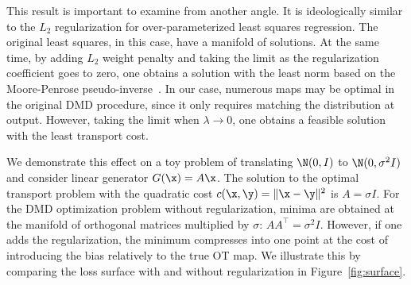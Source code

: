 This result is important to examine from another angle. It is ideologically similar to the $L_2$ regularization for over-parameterized least squares regression. The original least squares, in this case, have a manifold of solutions. At the same time, by adding $L_2$ weight penalty and taking the limit as the regularization coefficient goes to zero, one obtains a solution with the least norm based on the Moore-Penrose pseudo-inverse~\cite{moore1920reciprocal, penrose1955generalized}. In our case, numerous maps may be optimal in the original DMD procedure, since it only requires matching the distribution at output. However, taking the limit when $\lambda \rightarrow 0$, one obtains a feasible solution with the least transport cost.

We demonstrate this effect on a toy problem of translating $\N(0, I)$ to $\N(0, \sigma^2 I)$ and consider linear generator $G(\x) = A \x$. The solution to the optimal transport problem with the quadratic cost $c(\x, \y) = \| \x - \y \|^2$ is $A = \sigma I$. For the DMD optimization problem without regularization, minima are obtained at the manifold of orthogonal matrices multiplied by $\sigma$: $AA^\top = \sigma^2I$. However, if one adds the regularization, the minimum compresses into one point at the cost of introducing the bias relatively to the true OT map. We illustrate this by comparing the loss surface with and without regularization in Figure~\ref{fig:surface}.
